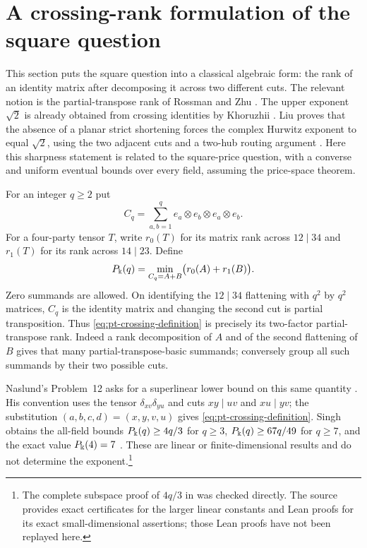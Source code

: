 \section{A crossing-rank formulation of the square question}
\label{sec:crossing-rank}

This section puts the square question into a classical algebraic
form: the rank of an identity matrix after decomposing it across
two different cuts. The relevant notion is the partial-transpose
rank of Rossman and Zhu \cite[Definition 3.4 and Lemma 3.5]{RossmanZhu2026}.
The upper exponent $\sqrt2$ is already obtained from crossing
identities by Khoruzhii \cite[Lemma 1 and Corollary 3]{Khoruzhii2026}.
Liu proves that the absence of a planar strict shortening forces
the complex Hurwitz exponent to equal $\sqrt2$, using the two
adjacent cuts and a two-hub routing argument
\cite[Section 2, p.~3, ``Two crossing cuts'']{Liu2026noncommutative}.
Here this sharpness statement is related to the square-price
question, with a converse and uniform eventual bounds over every
field, assuming the price-space theorem.

For an integer $q\geq2$ put
\[
 C_q=\sum_{a,b=1}^q e_a\otimes e_b\otimes e_a\otimes e_b.
\]
For a four-party tensor $T$, write $r_0(T)$ for its matrix rank
across $12\mid34$ and $r_1(T)$ for its rank across $14\mid23$.
Define
\begin{equation}\label{eq:pt-crossing-definition}
 P_\Bbbk(q)=\min_{C_q=A+B}\bigl(r_0(A)+r_1(B)\bigr).
\end{equation}
Zero summands are allowed. On identifying the $12\mid34$
flattening with $q^2$ by $q^2$ matrices, $C_q$ is the identity
matrix and changing the second cut is partial transposition.
Thus \eqref{eq:pt-crossing-definition} is precisely its
two-factor partial-transpose rank. Indeed a rank decomposition
of $A$ and of the second flattening of $B$ gives that many
partial-transpose-basic summands; conversely group all such
summands by their two possible cuts.

Naslund's Problem~12 asks for a superlinear lower bound on this
same quantity \cite{Naslund2020}. His convention uses the tensor
$\delta_{xv}\delta_{yu}$ and cuts $xy\mid uv$ and $xu\mid yv$;
the substitution $(a,b,c,d)=(x,y,v,u)$ gives
\eqref{eq:pt-crossing-definition}.
Singh obtains the all-field bounds $P_\Bbbk(q)\geq4q/3$ for $q\geq3$,
$P_\Bbbk(q)\geq67q/49$ for $q\geq7$, and the exact value
$P_\Bbbk(4)=7$ \cite[Theorems~1--4 and Corollary~5, p.~2]{Singh2026crossing}.
These are linear or finite-dimensional results and do not determine
the exponent.\footnote{The complete subspace proof of $4q/3$ in
\cite[Section~3, pp.~3--5]{Singh2026crossing} was checked directly.
The source provides exact certificates for the larger linear constants
and Lean proofs for its exact small-dimensional assertions; those
Lean proofs have not been replayed here.}

